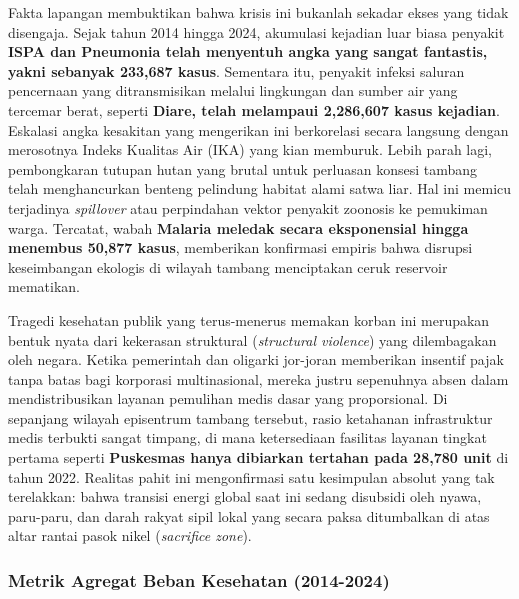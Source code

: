 \documentclass[
]{article}
\begin{document}
Fakta lapangan membuktikan bahwa krisis ini bukanlah sekadar ekses yang
tidak disengaja. Sejak tahun 2014 hingga 2024, akumulasi kejadian luar
biasa penyakit \textbf{ISPA dan Pneumonia telah menyentuh angka yang
sangat fantastis, yakni sebanyak 233,687 kasus}. Sementara itu, penyakit
infeksi saluran pencernaan yang ditransmisikan melalui lingkungan dan
sumber air yang tercemar berat, seperti \textbf{Diare, telah melampaui
2,286,607 kasus kejadian}. Eskalasi angka kesakitan yang mengerikan ini
berkorelasi secara langsung dengan merosotnya Indeks Kualitas Air (IKA)
yang kian memburuk. Lebih parah lagi, pembongkaran tutupan hutan yang
brutal untuk perluasan konsesi tambang telah menghancurkan benteng
pelindung habitat alami satwa liar. Hal ini memicu terjadinya
\emph{spillover} atau perpindahan vektor penyakit zoonosis ke pemukiman
warga. Tercatat, wabah \textbf{Malaria meledak secara eksponensial
hingga menembus 50,877 kasus}, memberikan konfirmasi empiris bahwa
disrupsi keseimbangan ekologis di wilayah tambang menciptakan ceruk
reservoir mematikan.

Tragedi kesehatan publik yang terus-menerus memakan korban ini merupakan
bentuk nyata dari kekerasan struktural (\emph{structural violence}) yang
dilembagakan oleh negara. Ketika pemerintah dan oligarki jor-joran
memberikan insentif pajak tanpa batas bagi korporasi multinasional,
mereka justru sepenuhnya absen dalam mendistribusikan layanan pemulihan
medis dasar yang proporsional. Di sepanjang wilayah episentrum tambang
tersebut, rasio ketahanan infrastruktur medis terbukti sangat timpang,
di mana ketersediaan fasilitas layanan tingkat pertama seperti
\textbf{Puskesmas hanya dibiarkan tertahan pada 28,780 unit} di tahun
2022. Realitas pahit ini mengonfirmasi satu kesimpulan absolut yang tak
terelakkan: bahwa transisi energi global saat ini sedang disubsidi oleh
nyawa, paru-paru, dan darah rakyat sipil lokal yang secara paksa
ditumbalkan di atas altar rantai pasok nikel (\emph{sacrifice zone}).

\subsubsection{Metrik Agregat Beban Kesehatan
(2014-2024)}\label{metrik-agregat-beban-kesehatan-2014-2024}
\end{document}
